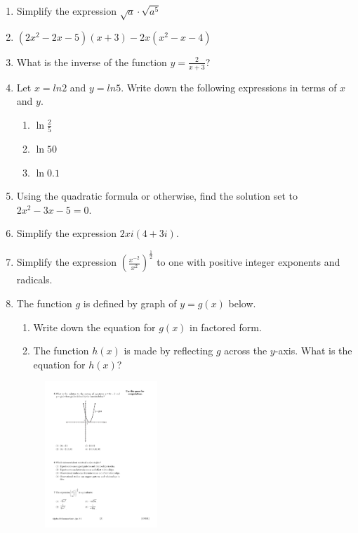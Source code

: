 \documentclass[12pt, oneside]{article}
\begin{document}
\begin{enumerate}
\item Simplify the expression $\sqrt{a} \cdot \sqrt{a^5}$

\item $(2x^2-2x-5)(x+3)-2x(x^2-x-4)$

\item What is the inverse of the function $y=\frac{2}{x+3}$?

\item Let $x=ln2$ and $y=ln5$. Write down the following expressions in terms of $x$ and $y$.
\begin{enumerate}
    \item $\ln \frac{2}{5}$
    \item $\ln 50$
    \item $\ln 0.1$
\end{enumerate}

\item Using the quadratic formula or otherwise, find the solution set to $2x^2-3x-5=0$.

\item Simplify the expression $2xi(4+3i)$.

\item Simplify the expression $\displaystyle \left( \frac{x^{-2}}{x^2} \right)^{\frac{1}{2}}$ to one with positive integer exponents and radicals.



\newpage
\item The function $g$ is defined by graph of $y=g(x)$ below.
\begin{enumerate}
    \item Write down the equation for $g(x)$ in factored form.
    \item The function $h(x)$ is made by reflecting $g$ across the $y$-axis. What is the equation for $h(x)$?
\end{enumerate}

\begin{figure}[!ht]
    \centering
    \includegraphics[width=0.4\textwidth]{parabola-graphic.pdf}
\end{figure}


\end{enumerate}
\end{document}
